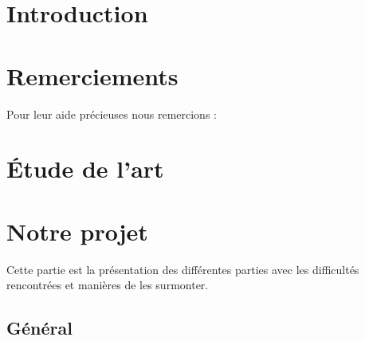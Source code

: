 \documentclass{article}
\begin{document}
\section{Introduction}
\vspace*{0,5cm}


\section{Remerciements}
Pour leur aide précieuses nous remercions : \\




\newpage
\section{Étude de l'art}



\newpage
\section{Notre projet}
Cette partie est la présentation des différentes parties avec les difficultés rencontrées et manières de les surmonter.


\subsection{Général}
\end{document}
